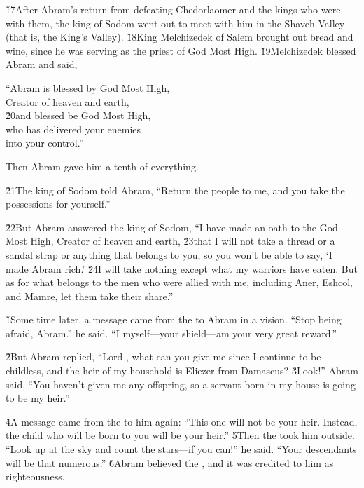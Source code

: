 \v{17}After Abram's return from defeating Chedorlaomer and the kings who were with them, the king of Sodom went out to meet with him in the Shaveh Valley (that is, the King's Valley). \v{18}King Melchizedek of Salem brought out bread and wine, since he was serving as the priest of God Most High. \v{19}Melchizedek blessed Abram and said,

\begin{poetry}
\poeml ``Abram is blessed by God Most High, \\
\poemll    Creator of heaven and earth, \\
\poeml \v{20}and blessed be God Most High, \\
\poemll    who has delivered your enemies \\
\poemlll       into your control.''
\end{poetry}

Then Abram gave him a tenth of everything.

\v{21}The king of Sodom told Abram, ``Return the people to me, and you take the possessions for yourself.''

\v{22}But Abram answered the king of Sodom, ``I have made an oath to the  God Most High, Creator of heaven and earth, \v{23}that I will not take a thread or a sandal strap or anything that belongs to you, so you won't be able to say, `I made Abram rich.' \v{24}I will take nothing except what my warriors have eaten. But as for what belongs to the men who were allied with me, including Aner, Eshcol, and Mamre, let them take their share.''

\v{1}Some time later, a message came from the  to Abram in a vision. ``Stop being afraid, Abram.'' he said. ``I myself---your shield---am your very great reward.''

\v{2}But Abram replied, ``Lord , what can you give me since I continue to be childless, and the heir of my household is Eliezer from Damascus? \v{3}Look!'' Abram said, ``You haven't given me any offspring, so a servant born in my house is going to be my heir.''

\v{4}A message came from the  to him again: ``This one will not be your heir. Instead, the child who will be born to you will be your heir.'' \v{5}Then the  took him outside. ``Look up at the sky and count the stars---if you can!'' he said. ``Your descendants will be that numerous.'' \v{6}Abram believed the , and it was credited to him as righteousness.

